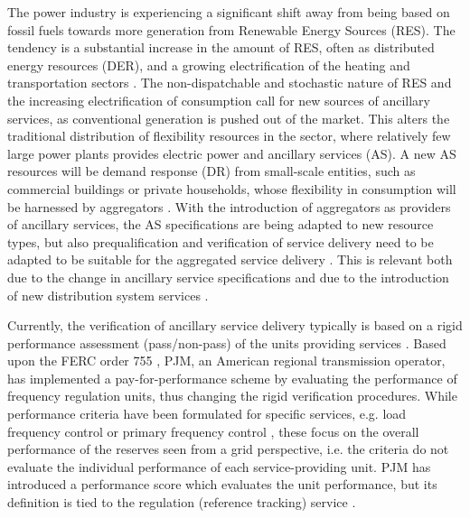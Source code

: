 The power industry is experiencing a significant shift away from being based on fossil fuels towards more generation from Renewable Energy Sources (RES). The tendency is a substantial increase in the amount of RES, often as distributed energy resources (DER), and a growing electrification of the heating and transportation sectors \cite{iea2012a,eurelectric2011}. The non-dispatchable and stochastic nature of RES and the increasing electrification of consumption call for new sources of ancillary services, as conventional generation is pushed out of the market. This alters the traditional distribution of flexibility resources in the sector, where relatively few large power plants provides electric power and ancillary services (AS). A new AS resources will be demand response (DR) from small-scale entities, such as commercial buildings or private households, whose flexibility in consumption will be harnessed by aggregators \cite{pudjianto2007virtual,koch2011modeling,biegel2013primary,vrettos2015frequency,mathieu2012using,sullivan2013using}. 
With the introduction of aggregators as providers of ancillary services, the AS specifications are being adapted to new resource types, but also prequalification and verification of service delivery need to be adapted to be suitable for the aggregated service delivery \cite{bode2013incorporating}. This is relevant both due to the change in ancillary service specifications and due to the introduction of new distribution system services \cite{heussen2013clearinghouse}.

Currently, the verification of ancillary service delivery typically is based on a rigid performance assessment (pass/non-pass) of the units providing services \cite{EnerginetAncillary}. Based upon the FERC order 755 \cite{order755}, PJM, an American regional transmission operator, has implemented a pay-for-performance scheme by evaluating the performance of frequency regulation units, thus changing the rigid verification procedures.
While performance criteria have been formulated for specific services, e.g. load frequency control \cite{gross2001analysis} or primary frequency control \cite{eto2010use}, these focus on the overall performance of the reserves seen from a grid perspective, i.e. the criteria do not evaluate the individual performance of each service-providing unit. PJM has introduced a performance score which evaluates the unit performance, but its definition is tied to the regulation (reference tracking) service \cite{pjm2015balance}.

